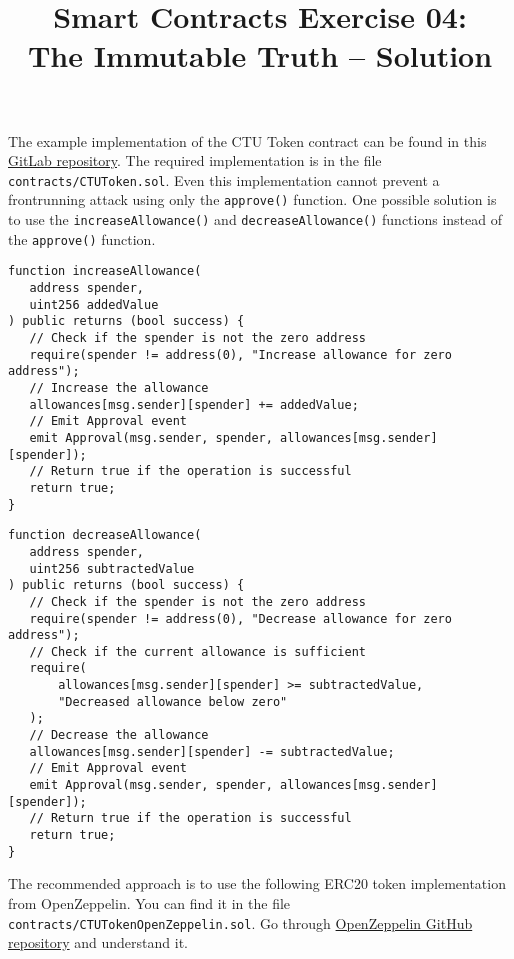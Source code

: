 \documentclass[12pt]{article}
\title{Smart Contracts Exercise 04: \\ The Immutable Truth -- Solution}
\author{}
\date{}
\begin{document}
\maketitle
The example implementation of the CTU Token contract can be found in this \href{https://gitlab.fel.cvut.cz/radovluk/smart-contracts-exercises/-/tree/main/03-ERC20-CTUToken/solution/solution-code}{GitLab repository}. The required implementation is in the file \texttt{contracts/CTUToken.sol}. Even this implementation cannot prevent a frontrunning attack using only the \texttt{approve()} function. One possible solution is to use the \texttt{increaseAllowance()} and \texttt{decreaseAllowance()} functions instead of the \texttt{approve()} function.

\begin{verbatim}
function increaseAllowance(
   address spender,
   uint256 addedValue
) public returns (bool success) {
   // Check if the spender is not the zero address
   require(spender != address(0), "Increase allowance for zero address");
   // Increase the allowance
   allowances[msg.sender][spender] += addedValue;
   // Emit Approval event
   emit Approval(msg.sender, spender, allowances[msg.sender][spender]);
   // Return true if the operation is successful
   return true;
}
\end{verbatim}

\begin{verbatim}
function decreaseAllowance(
   address spender,
   uint256 subtractedValue
) public returns (bool success) {
   // Check if the spender is not the zero address
   require(spender != address(0), "Decrease allowance for zero address");
   // Check if the current allowance is sufficient
   require(
       allowances[msg.sender][spender] >= subtractedValue,
       "Decreased allowance below zero"
   );
   // Decrease the allowance
   allowances[msg.sender][spender] -= subtractedValue;
   // Emit Approval event
   emit Approval(msg.sender, spender, allowances[msg.sender][spender]);
   // Return true if the operation is successful
   return true;
}
\end{verbatim}

The recommended approach is to use the following ERC20 token implementation from OpenZeppelin. You can find it in the file \texttt{contracts/CTUTokenOpenZeppelin.sol}.
Go through \href{https://github.com/OpenZeppelin/openzeppelin-contracts/blob/master/contracts/token/ERC20/ERC20.sol}{OpenZeppelin GitHub repository} and understand it.
\end{document}
